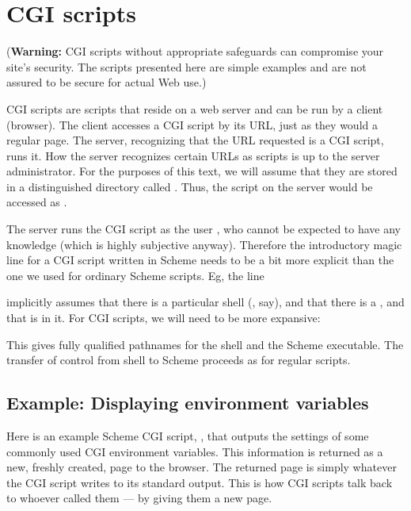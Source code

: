 \chapter{CGI scripts}

{\color[rgb]{1,0,0}({\bf Warning:} CGI scripts without
appropriate safeguards can compromise your site's
security.  The scripts presented here are simple
examples and are not assured to be secure for actual
Web use.)}

\medskip

CGI scripts \cite{cgi} are scripts that reside on a
web server and can be run by a client (browser).  The
client accesses a CGI script by its URL, just as they
would a regular page.  The server, recognizing that the
URL requested is a CGI script, runs it.  How the server
recognizes certain URLs as scripts is up to the server
administrator.  For the purposes of this text, we will
assume that they are stored in a distinguished
directory called .  Thus, the script
 on the server  would
be accessed as .

The server runs the CGI script as the user ,
who cannot be expected to have any
 knowledge (which is highly subjective
anyway).  Therefore the introductory magic line for a
CGI script written in Scheme needs to be a bit more
explicit than the one we used for ordinary Scheme
scripts.  Eg, the line


\n implicitly assumes that there is a particular shell
(, say), and that there is a , and that
 is in it.  For CGI scripts, we will need
to be more expansive:


This gives fully qualified pathnames for the shell and
the Scheme executable.  The transfer of control from
shell to Scheme proceeds as for regular scripts.

\section{Example: Displaying environment variables}

Here is an example Scheme CGI script,
, that outputs the settings of some
commonly used CGI environment variables.  This
information is returned as a new, freshly created, page
to the browser.  The returned page is simply whatever
the CGI script writes to its standard output.  This is
how CGI scripts talk back to whoever called them --- by
giving them a new page.

